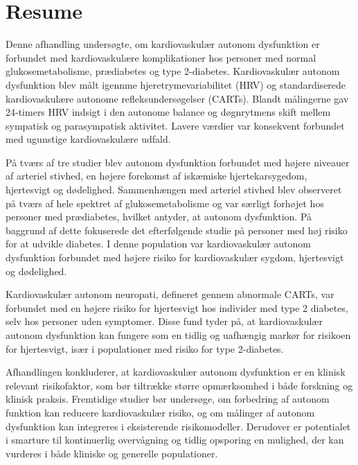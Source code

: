 \documentclass[
  a4paper,
  headsepline=true,
  open=any]{scrbook}
\begin{document}

\hypertarget{resume-1}{%
\chapter*{Resume}\label{resume-1}}


Denne afhandling undersøgte, om kardiovaskulær autonom dysfunktion er
forbundet med kardiovaskulære komplikationer hos personer med normal
glukosemetabolisme, prædiabetes og type 2-diabetes. Kardiovaskulær
autonom dysfunktion blev målt igennme hjeretrymevariabilitet (HRV) og
standardiserede kardiovaskulære autonome refleksundersøgelser (CARTs).
Blandt målingerne gav 24-timers HRV indsigt i den autonome balance og
døgnrytmens skift mellem sympatisk og parasympatisk aktivitet. Lavere
værdier var konsekvent forbundet med ugunstige kardiovaskulære udfald.

På tværs af tre studier blev autonom dysfunktion forbundet med højere
niveauer af arteriel stivhed, en højere forekomst af iskæmiske
hjertekarsygedom, hjertesvigt og dødelighed. Sammenhængen med arteriel
stivhed blev observeret på tværs af hele spektret af glukosemetabolisme
og var særligt forhøjet hos personer med prædiabetes, hvilket antyder,
at autonom dysfunktion. På baggrund af dette fokuserede det
efterfølgende studie på personer med høj risiko for at udvikle diabetes.
I denne population var kardiovaskulær autonom dysfunktion forbundet med
højere risiko for kardiovaskulær sygdom, hjertesvigt og dødelighed.

Kardiovaskulær autonom neuropati, defineret gennem abnormale CARTs, var
forbundet med en højere risiko for hjertesvigt hos individer med type 2
diabetes, selv hos personer uden symptomer. Disse fund tyder på, at
kardiovaskulær autonom dysfunktion kan fungere som en tidlig og
uafhængig markør for risikoen for hjertesvigt, især i populationer med
risiko for type 2-diabetes.

Afhandlingen konkluderer, at kardiovaskulær autonom dysfunktion er en
klinisk relevant risikofaktor, som bør tiltrække større opmærksomhed i
både forskning og klinisk praksis. Fremtidige studier bør undersøge, om
forbedring af autonom funktion kan reducere kardiovaskulær risiko, og om
målinger af autonom dysfunktion kan integreres i eksisterende
risikomodeller. Derudover er potentialet i smarture til kontinuerlig
overvågning og tidlig opsporing en mulighed, der kan vurderes i både
kliniske og generelle populationer.
\end{document}
